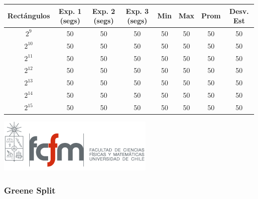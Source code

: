 \documentclass[letterpaper,10pt]{article}
\begin{document}
	\begin{center}

		\begin{tabular}{|c|c|c|c|c|c|c|c|}
			\hline
			Rectángulos	& Exp. 1 (segs) & Exp. 2 (segs) & Exp. 3 (segs) & Min & Max & Prom & Desv. Est\\
			\hline
			$2^{9}$ 	& 50 	& 50 	& 50 	& 50 	& 50 	& 50 	& 50 \\
			\hline
			$2^{10}$ 	& 50 	& 50 	& 50 	& 50 	& 50 	& 50 	& 50 \\
			\hline
			$2^{11}$ 	& 50 	& 50 	& 50 	& 50 	& 50 	& 50 	& 50 \\
			\hline
			$2^{12}$ 	& 50 	& 50 	& 50 	& 50 	& 50 	& 50 	& 50 \\
			\hline
			$2^{13}$ 	& 50 	& 50 	& 50 	& 50 	& 50 	& 50 	& 50 \\
			\hline
			$2^{14}$ 	& 50 	& 50 	& 50 	& 50 	& 50 	& 50 	& 50 \\
			\hline
			$2^{15}$ 	& 50 	& 50 	& 50 	& 50 	& 50 	& 50 	& 50 \\
			\hline
		\end{tabular}

		\includegraphics{logoFCFM.png}
	\end{center}

	\subsubsection{Greene Split}
\end{document}
